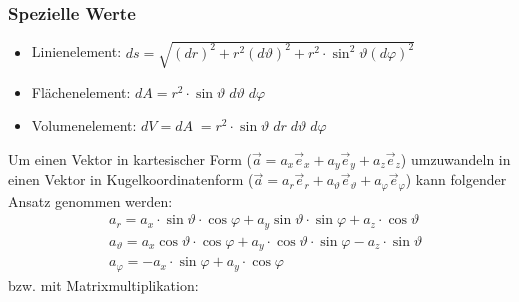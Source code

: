 \documentclass[a4paper,10pt]{scrartcl}
\begin{document}
            \subsubsection*{Spezielle Werte}
            \begin{itemize}
                \item Linienelement: \(ds = \sqrt{(dr)^2 + r^2(d\vartheta)^2 + r^2 \cdot \sin^2 \vartheta (d\varphi)^2} \)
                \item Flächenelement: \(dA = r^2 \cdot \sin \vartheta \; d\vartheta \; d\varphi \)
                \item Volumenelement: \(dV = dA \; = r^2 \cdot \sin \vartheta \; dr \; d\vartheta \; d\varphi\)
            \end{itemize}
            Um einen Vektor in kartesischer Form (\(\vec{a} = a_x\vec{e}_x + a_y \vec{e}_y + a_z \vec{e}_z \)) umzuwandeln in einen Vektor in Kugelkoordinatenform 
            (\(\vec{a} = a_r\vec{e}_r + a_\vartheta\vec{e}_\vartheta + a_\varphi\vec{e}_\varphi\)) kann folgender Ansatz genommen werden:
            \begin{equation*}
                \begin{aligned}
                    & a_r = a_x \cdot \sin \vartheta \cdot \cos \varphi + a_y \sin \vartheta \cdot \sin \varphi + a_z \cdot \cos \vartheta \\
                    & a_\vartheta = a_x \cos \vartheta \cdot \cos \varphi + a_y \cdot \cos \vartheta \cdot \sin \varphi - a_z \cdot \sin \vartheta \\
                    & a_\varphi = -a_x \cdot \sin \varphi + a_y \cdot \cos \varphi
                \end{aligned}
            \end{equation*}
            bzw. mit Matrixmultiplikation: 
\end{document}
